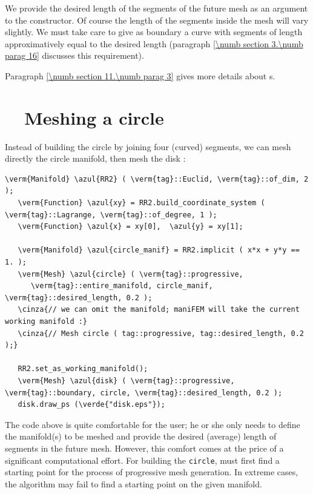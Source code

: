 We provide the desired length of the segments of the future mesh as an argument to the
constructor.
Of course the length of the segments inside the mesh will vary slightly.
We must take care to give as boundary a curve with segments of length approximatively equal
to the desired length (paragraph \ref{\numb section 3.\numb parag 16} discusses
this requirement).

Paragraph \ref{\numb section 11.\numb parag 3} gives more details about {\small\tt {}}s.


\section{~~Meshing a circle}\label{\numb section 3.\numb parag 2}

Instead of building the circle by joining four (curved) segments, we can mesh directly
the circle manifold, then mesh the disk :

\begin{Verbatim}[commandchars=\\\{\},formatcom=\small\tt,frame=single,
   label=parag-\ref{\numb section 3.\numb parag 2}.cpp,rulecolor=\color{coment},
   baselinestretch=0.94,framesep=2mm                                            ]
   \verm{Manifold} \azul{RR2} ( \verm{tag}::Euclid, \verm{tag}::of_dim, 2 );
   \verm{Function} \azul{xy} = RR2.build_coordinate_system ( \verm{tag}::Lagrange, \verm{tag}::of_degree, 1 );
   \verm{Function} \azul{x} = xy[0],  \azul{y} = xy[1];
   
   \verm{Manifold} \azul{circle_manif} = RR2.implicit ( x*x + y*y == 1. );
   \verm{Mesh} \azul{circle} ( \verm{tag}::progressive,
      \verm{tag}::entire_manifold, circle_manif, \verm{tag}::desired_length, 0.2 );
   \cinza{// we can omit the manifold; maniFEM will take the current working manifold :}
   \cinza{// Mesh circle ( tag::progressive, tag::desired_length, 0.2 );}
   
   RR2.set_as_working_manifold();
   \verm{Mesh} \azul{disk} ( \verm{tag}::progressive, \verm{tag}::boundary, circle, \verm{tag}::desired_length, 0.2 );
   disk.draw_ps (\verde{"disk.eps"});
\end{Verbatim}

The code above is quite comfortable for the user; he or she only needs to define
the manifold(s) to be meshed and provide the desired (average) length of segments
in the future mesh.
However, this comfort comes at the price of a significant computational effort.
For building the {\small\tt circle}, {\ManiFEM} must first find a starting point for the process
of progressive mesh generation.
In extreme cases, the algorithm may fail to find a starting point on the given manifold.

